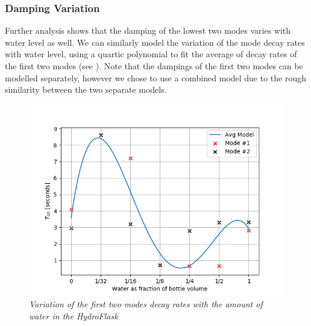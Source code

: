 \documentclass[twoside,a4paper]{article}
\begin{document}
\subsubsection{Damping Variation} \label{sec:water-damp}
%
Further analysis shows that the damping of the lowest two modes
varies with water level as well. We can similarly model the
variation of the mode decay rates with water level, using a
quartic polynomial to fit the average of decay rates of the first
two modes (see ). Note that the dampings
of the first two modes can be modelled separately, however we chose
to use a combined model due to the rough similarity between the
two separate models.
%
\begin{figure}[!htb]
    \centering
    \includegraphics[width=\linewidth,trim={0 0 1cm 1cm},clip]{../Figures/Water_Damping}
    \caption{\it{Variation of the first two modes decay rates
                 with the amount of water in the HydroFlask}}
    \label{fig:water-mode-damp}
\end{figure}
%
\end{document}
